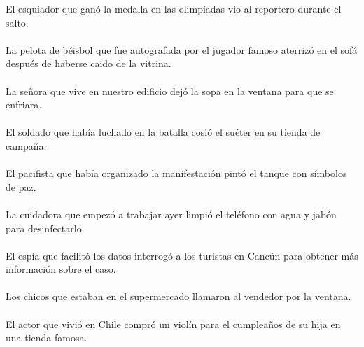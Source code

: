 El esquiador que gan\'{o} la medalla en las olimpiadas vio al reportero durante el salto.	\\	\\
La pelota de béisbol que fue autografada por el jugador famoso aterriz\'{o} en el sof\'{a} después de haberse caido de la vitrina.	\\	\\
La se\~{n}ora que vive en nuestro edificio dej\'{o} la sopa en la ventana para que se enfriara.	\\	\\
El soldado que hab\'{i}a luchado en la batalla cosi\'{o} el suéter en su tienda de campa\~{n}a.	\\	\\
El pacifista que hab\'{i}a organizado la manifestaci\'{o}n pint\'{o} el tanque con s\'{i}mbolos de paz.	\\	\\
La cuidadora que empez\'{o} a trabajar ayer limpi\'{o} el teléfono con agua y jab\'{o}n para desinfectarlo.	\\	\\
El esp\'{i}a que facilit\'{o} los datos interrog\'{o} a los turistas en Canc\'{u}n para obtener m\'{a}s informaci\'{o}n sobre el caso.	\\	\\
Los chicos que estaban en el supermercado llamaron al vendedor por la ventana.	\\	\\
El actor que vivi\'{o} en Chile compr\'{o} un viol\'{i}n para el cumplea\~{n}os de su hija en una tienda famosa.	\\	\\

